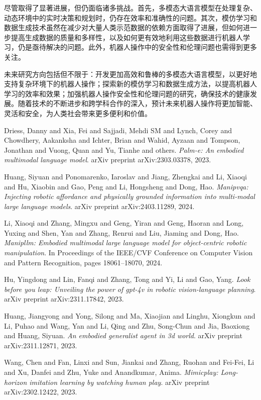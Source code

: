 \documentclass[a4paper]{article}
\begin{document}
尽管取得了显著进展，但仍面临诸多挑战。首先，多模态大语言模型在处理复杂、动态环境中的实时决策和规划时，仍存在效率和准确性的问题。其次，模仿学习和数据生成技术虽然在减少对大量人类示范数据的依赖方面取得了进展，但如何进一步提高生成数据的质量和多样性，以及如何更有效地利用这些数据进行机器人学习，仍是亟待解决的问题。此外，机器人操作中的安全性和伦理问题也需得到更多关注。

未来研究方向包括但不限于：开发更加高效和鲁棒的多模态大语言模型，以更好地支持复杂环境下的机器人操作；探索新的模仿学习和数据生成方法，以提高机器人学习的效率和效果；加强机器人操作安全性和伦理问题的研究，确保技术的健康发展。随着技术的不断进步和跨学科合作的深入，预计未来机器人操作将更加智能、灵活和安全，为人类社会带来更多便利和价值。
\begin{thebibliography}{99}
Driess, Danny and Xia, Fei and Sajjadi, Mehdi SM and Lynch, Corey and Chowdhery, Aakanksha and Ichter, Brian and Wahid, Ayzaan and Tompson, Jonathan and Vuong, Quan and Yu, Tianhe and others. \textit{Palm-e: An embodied multimodal language model}. arXiv preprint arXiv:2303.03378, 2023.

Huang, Siyuan and Ponomarenko, Iaroslav and Jiang, Zhengkai and Li, Xiaoqi and Hu, Xiaobin and Gao, Peng and Li, Hongsheng and Dong, Hao. \textit{Manipvqa: Injecting robotic affordance and physically grounded information into multi-modal large language models}. arXiv preprint arXiv:2403.11289, 2024.

Li, Xiaoqi and Zhang, Mingxu and Geng, Yiran and Geng, Haoran and Long, Yuxing and Shen, Yan and Zhang, Renrui and Liu, Jiaming and Dong, Hao. \textit{Manipllm: Embodied multimodal large language model for object-centric robotic manipulation}. In Proceedings of the IEEE/CVF Conference on Computer Vision and Pattern Recognition, pages 18061--18070, 2024.

Hu, Yingdong and Lin, Fanqi and Zhang, Tong and Yi, Li and Gao, Yang. \textit{Look before you leap: Unveiling the power of gpt-4v in robotic vision-language planning}. arXiv preprint arXiv:2311.17842, 2023.

Huang, Jiangyong and Yong, Silong and Ma, Xiaojian and Linghu, Xiongkun and Li, Puhao and Wang, Yan and Li, Qing and Zhu, Song-Chun and Jia, Baoxiong and Huang, Siyuan. \textit{An embodied generalist agent in 3d world}. arXiv preprint arXiv:2311.12871, 2023.

Wang, Chen and Fan, Linxi and Sun, Jiankai and Zhang, Ruohan and Fei-Fei, Li and Xu, Danfei and Zhu, Yuke and Anandkumar, Anima. \textit{Mimicplay: Long-horizon imitation learning by watching human play}. arXiv preprint arXiv:2302.12422, 2023.


\end{thebibliography}
\end{document}

